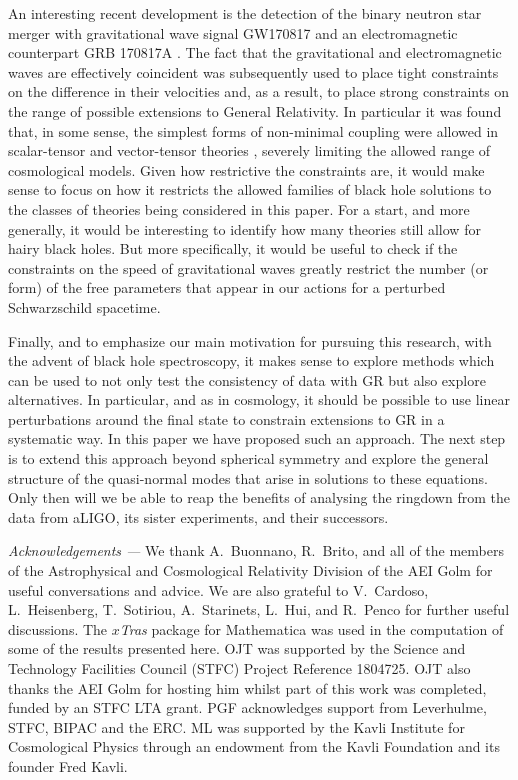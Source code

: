 \documentclass[10pt,twocolumn,preprintnumbers,amsmath,amssymb,nofootinbib
,superscriptaddress]{revtex4-1}
\begin{document}
{{{An interesting recent development is the detection of the binary neutron star merger with gravitational wave signal GW170817 \cite{PhysRevLett.119.161101} and an electromagnetic counterpart GRB 170817A \cite{2041-8205-848-2-L12,2041-8205-848-2-L13,2041-8205-848-2-L14,2041-8205-848-2-L15}. The fact that the gravitational and electromagnetic waves are effectively coincident was subsequently used to place tight constraints on the difference in their velocities and, as a result, to place strong constraints on the range of possible extensions to General Relativity. In particular it was found that, in some sense, the simplest forms of non-minimal coupling were allowed in scalar-tensor and vector-tensor theories \cite{Baker:2017hug,Creminelli:2017sry,Sakstein:2017xjx,Ezquiaga:2017ekz}, severely limiting the allowed range of cosmological models. Given how restrictive the constraints are, it would make sense to focus on how it restricts the allowed families of black hole solutions to the classes of theories being considered in this paper. For a start, and more generally, it would be interesting to identify how many theories still allow for hairy black holes. But more specifically, it would be useful to check if the constraints on the speed of gravitational waves greatly restrict the number (or form) of the free parameters that appear in our actions for a perturbed Schwarzschild spacetime. 

Finally, and to emphasize our main motivation for pursuing this research, with the advent of black hole spectroscopy, it makes sense to explore methods which can be used to not only test the consistency of data with GR but also explore alternatives. In particular, and as in cosmology, it should be possible to use linear perturbations around the final state to constrain extensions to GR in a systematic way. In this paper we have proposed such an approach. The next step is to extend this approach beyond spherical symmetry and explore the general structure of the quasi-normal modes that arise in solutions to these equations. Only then will we be able to reap the benefits of analysing the ringdown from the data from aLIGO, its sister experiments, and their successors.



\textit{Acknowledgements ---} We thank A.~Buonnano, R.~Brito, and all of the members of the Astrophysical and Cosmological Relativity Division of the AEI Golm for useful conversations and advice. We are also grateful to V.~Cardoso, L.~Heisenberg, T.~Sotiriou, A.~Starinets, L.~Hui, and R.~Penco for further useful discussions. The $x$\textit{Tras} package for Mathematica \cite{Nutma:2013zea} was used in the computation of some of the results presented here. OJT was supported by the Science and Technology Facilities Council (STFC) Project Reference 1804725. OJT also thanks the AEI Golm for hosting him whilst part of this work was completed, funded by an STFC LTA grant. PGF acknowledges support from Leverhulme, STFC, BIPAC and the ERC. ML was supported by the Kavli Institute for Cosmological Physics through an endowment from the Kavli Foundation and its founder Fred Kavli.

}}}
\end{document}
